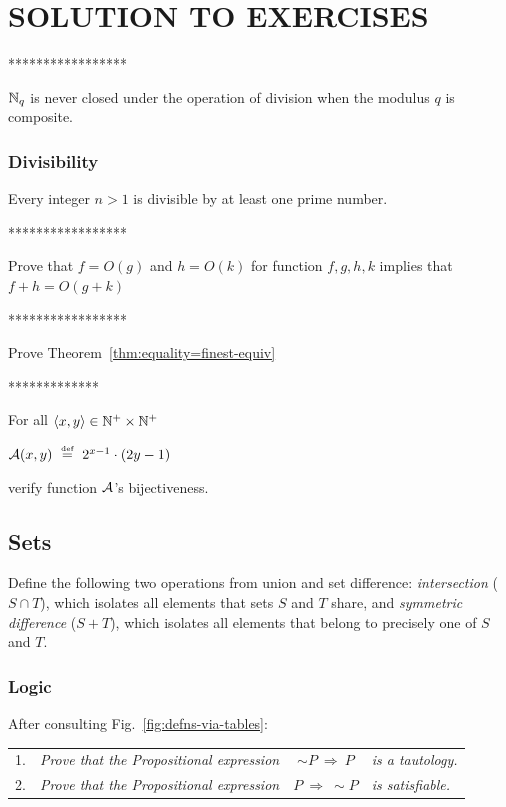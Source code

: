 
\chapter{SOLUTION TO EXERCISES}
\label{ch:Exercises}


*****************

$\mathbb{N}_q$ is never closed under the operation of division when the modulus $q$ is composite.

\subsection{Divisibility}

Every integer $n>1$ is divisible by at least one prime number.

*****************

Prove that $f = O(g)$ and $h = O(k)$ for function $f,g,h,k$ implies that
$f+h = O(g+k)$

*****************

Prove Theorem~\ref{thm:equality=finest-equiv}

*************

For all $\langle x,y \rangle \in \mathbb{N}^+ \times \mathbb{N}^+$

$\mbox{$\cal A$}(x,y) \ \stackrel{\mbox{{\tiny def}}}{=} \ 2^{x-1} \cdot (2y -1)$

verify function $\mbox{$\cal A$}$'s
bijectiveness.



\section{Sets}

Define the following two operations from union and set
difference: {\it intersection} ($S \cap T$), which isolates all
elements that sets $S$ and $T$ share, and {\it symmetric difference}
($S+T$), which isolates all elements that belong to precisely one of
$S$ and $T$.


\subsection{Logic}

After consulting Fig.~\ref{fig:defns-via-tables}:

\begin{tabular}{llcl}
1. &
{\it Prove that the Propositional expression} &
$\sim P \ \Rightarrow \ P$ &
{\it is a tautology.} \\
2. &
{\it Prove that the Propositional expression} &
$P \ \Rightarrow \ \sim P$ &
{\it is satisfiable.}
\end{tabular}

